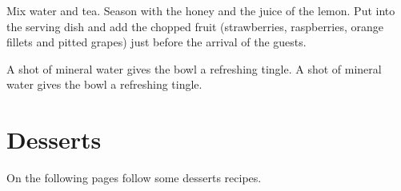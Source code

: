 \documentclass[]{article}
\begin{document}
\preparation
{%
    \init Mix water and tea. Season with the honey and the juice of the lemon.
    \init Put into the serving dish and add the chopped fruit (strawberries, raspberries, orange fillets and pitted grapes) just before the arrival of the guests.
}

\hint
{%
    A shot of mineral water gives the bowl a refreshing tingle. A shot of mineral water gives the bowl a refreshing tingle.
}

\graph       %
[%
    recipename=Fruit bowl,
    recipetime={5 min},
    portion={For 4 person},
    joule={1 kJ},
    source=CookyBooky example,
    sgraph=,
    sdx=-2,
    sdy=0,
    bgraph=,
    bdx=0,
    bdy=0
]%

\newpage



\section{Desserts}
On the following pages follow some desserts recipes.

\newpage


\end{document}
